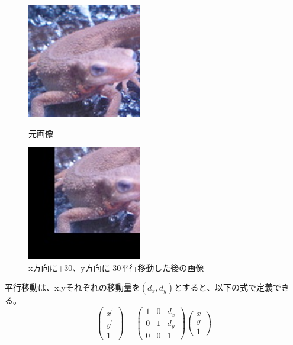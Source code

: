         \begin{figure}[htbp]
            \begin{minipage}{0.5\hsize}
                \begin{center}
                    \includegraphics[width=50mm]{./8_appendix/img/imori.jpg}
                \end{center}
                \caption{元画像}
            \end{minipage}
            \begin{minipage}{0.5\hsize}
                \begin{center}
                    \includegraphics[width=50mm]{./8_appendix/img/imori_Translation.jpg}
                \end{center}
                \caption{x方向に+30、y方向に-30平行移動した後の画像}
            \end{minipage}
        \end{figure}

        平行移動は、x,yそれぞれの移動量を$(d_x, d_y)$とすると、以下の式で定義できる。
        \begin{equation}
            \left(\begin{array}{l}
            x^{\prime} \\
            y^{\prime} \\
            1
            \end{array}\right)
            =
            \left(\begin{array}{lll}
            1 & 0 & d_x\\
            0 & 1 & d_y\\
            0 & 0 & 1
            \end{array}\right)
            \left(\begin{array}{l}
            x \\
            y \\
            1
            \end{array}\right)
        \end{equation}

